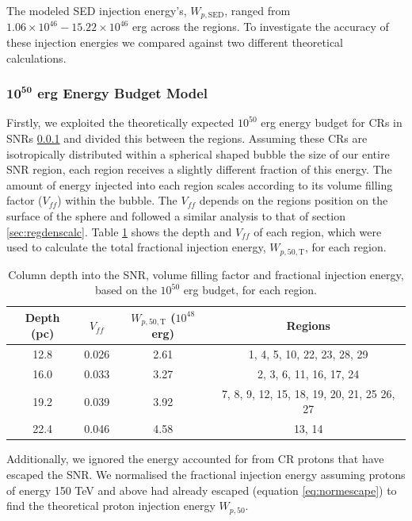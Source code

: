 \documentclass[12pt,a4paper]{article}
\begin{document}
The modeled SED injection energy's, $W_{p,\mathrm{SED}}$, ranged from $1.06 \times 10^{46} - 15.22 \times 10^{46}$ erg across the regions. To investigate the accuracy of these injection energies we compared against two different theoretical calculations. 

\subsubsection{$\mathbf{10^{50}}$ erg Energy Budget Model}
Firstly, we exploited the theoretically expected $10^{50}$ erg energy budget for CRs in SNRs \ref{} and divided this between the regions. Assuming these CRs are isotropically distributed within a spherical shaped bubble the size of our entire SNR region, each region receives a slightly different fraction of this energy. The amount of energy injected into each region scales according to its volume filling factor ($V_{ff}$) within the bubble. The $V_{ff}$ depends on the regions position on the surface of the sphere and followed a similar analysis to that of section \ref{sec:regdenscalc}. Table \ref{tab:regionalvolumes} shows the depth and $V_{ff}$ of each region, which were used to calculate the total fractional injection energy, $W_{p,50,\mathrm{T}}$, for each region. 
\begin{table}[H] 
	\begin{center}
		\begin{tabular}{cccc}
			\toprule
			Depth (pc) & $V_{ff}$ &  $W_{p,50,\mathrm{T}}$ ($10^{48}$erg) & Regions \\
			\hline
			12.8 & 0.026 & 2.61 & 1, 4, 5, 10, 22, 23, 28, 29 \\
			16.0 & 0.033 & 3.27 & 2, 3, 6, 11, 16, 17, 24 \\
			19.2 & 0.039 & 3.92 & 7, 8, 9, 12, 15, 18, 19, 20, 21, 25 26, 27 \\
			22.4 & 0.046 & 4.58 & 13, 14 \\
			\bottomrule
		\end{tabular} 
	\end{center}
	\caption{Column depth into the SNR, volume filling factor and fractional injection energy, based on the $10^{50}$ erg budget, for each region.}
	\label{tab:regionalvolumes}
\end{table}
Additionally, we ignored the energy accounted for from CR protons that have escaped the SNR. We normalised the fractional injection energy assuming protons of energy 150 TeV and above had already escaped (equation \ref{eq:normescape}) to find the theoretical proton injection energy $W_{p,50}$. 
\end{document}
